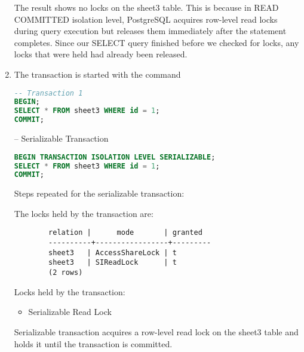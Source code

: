 \documentclass{article}
\begin{document}
\begin{enumerate}[label=\alph*)]
        The result shows no locks on the sheet3 table. This is because in READ COMMITTED isolation level, PostgreSQL acquires row-level read locks during query execution but releases them immediately after the statement completes. Since our SELECT query finished before we checked for locks, any locks that were held had already been released.

        \item The transaction is started with the command \begin{lstlisting}[language=sql]
-- Transaction 1
BEGIN;
SELECT * FROM sheet3 WHERE id = 1;
COMMIT;
        \end{lstlisting}

        -- Serializable Transaction
        \begin{lstlisting}[language=sql]
BEGIN TRANSACTION ISOLATION LEVEL SERIALIZABLE;
SELECT * FROM sheet3 WHERE id = 1;
COMMIT;
        \end{lstlisting}

        Steps repeated for the serializable transaction:

        The locks held by the transaction are:

        \begin{lstlisting}
        relation |      mode       | granted 
        ----------+-----------------+---------
        sheet3   | AccessShareLock | t
        sheet3   | SIReadLock      | t
        (2 rows)
        \end{lstlisting}
        Locks held by the transaction:
        \begin{itemize}
            \item Serializable Read Lock 
        \end{itemize}
        
        Serializable transaction acquires a row-level read lock on the sheet3 table and holds it until the transaction is committed.
        
    \end{enumerate}
    
\end{document}
